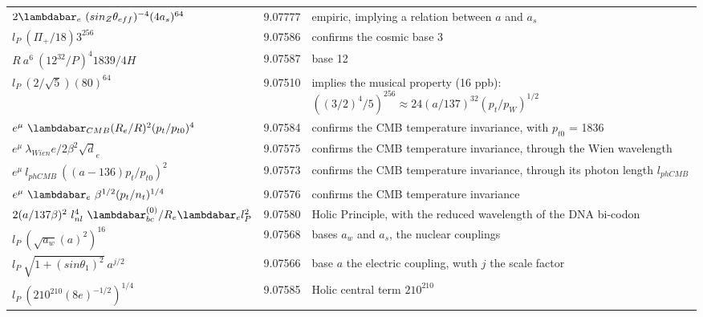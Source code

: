 \documentclass[a4paper,9pt]{article}
\begin{document}
\begin{table}
\begin{tabular}{lll}
 $ 2\lambdabar_{e}~ (sin_Z \theta_{eff})^{-4} (4a_s)^{64}$ & 9.07777 & empiric, implying a relation between $a$ and $a_s$ \\
 
 
 $ l_P ~(\Pi_+/18)3^{256}$ & 9.07586 & confirms the cosmic base 3 \\
 
 
  $ R ~ a^6 ~(12^{32}/P)^{4} 1839/4H$ & 9.07587 & base 12 \\
 
 
 
 
 
 
 $ l_P ~(2/\sqrt5)(80)^{64}$ & 9.07510 & implies the musical property (16 ppb): $((3/2)^4/5)^{256} \approx 24 (a/137)^{32}(p_t/p_W)^{1/2}$ \\
 
 $ e^{\mu} ~\lambdabar_{CMB} (R_e/R)^2 (p_t/p_{t0})^4$ & 9.07584 & confirms the CMB temperature invariance, with $p_{t0}$ = 1836 \\
 
 $ e^{\mu} ~\lambda_{Wien} e/2\beta^2 \sqrt d_e$ & 9.07575 & confirms the CMB temperature invariance, through the Wien wavelength\\
 
 
 $ e^{\mu} ~l_{phCMB} ~((a-136)p_t/p_{t0})^2$ & 9.07573 & confirms the CMB temperature invariance, through its photon length $l_{phCMB}$\\
 
 
 $ e^{\mu}~ \lambdabar_{e}~ \beta^{1/2} (p_t/n_t)^{1/4} $ & 9.07576 & confirms the CMB temperature invariance \\
 
 
 $ 2(a/137\beta)^2 ~l_{nl}^4 ~\lambdabar_{bc}^{(0)}/R_e \lambdabar_el_P^2 $ & 9.07580 & Holic Principle, with the reduced wavelength of the DNA bi-codon \\
 
 
 
 $ l_P ~ (\sqrt{a_w}(a)^2)^{16}  $ & 9.07568 & bases  $a_w$ and $a_s$, the nuclear couplings  \\
 
 
 $ l_P ~ \sqrt{1 + (sin\theta_1)^2}~a^{j/2}  $ & 9.07566 & base $a$ the electric coupling, wuth $j$ the scale factor \cite{Sanchez2} \\
 
 
 
 $ l_P ~ (210^{210}(8e)^{-1/2})^{1/4}  $ & 9.07585 & Holic central term $210^{210}$  \\
 

\end{tabular}
\end{table}
\end{document}
